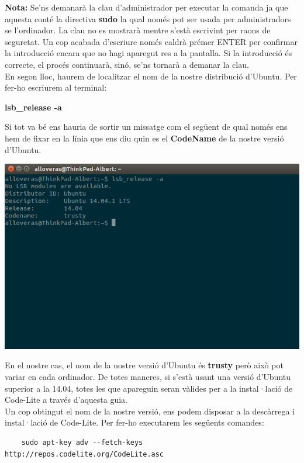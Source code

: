 \documentclass[11pt]{article}
\begin{document}
\noindent \textbf{Nota:} Se'ns demanarà la clau d'administrador per executar la comanda ja que aquesta conté la directiva \textbf{sudo} la qual només pot ser usada per administradors se l'ordinador. La clau no es mostrarà mentre s'està escrivint per raons de seguretat. Un cop acabada d'escriure només caldrà prémer ENTER per confirmar la introducció encara que no hagi aparegut res a la pantalla. Si la introducció és correcte, el procés continuarà, sinó, se'ns tornarà a demanar la clau. \\

\noindent En segon lloc, haurem de localitzar el nom de la nostre distribució d'Ubuntu. Per fer-ho escriurem al terminal:
\begin{center}
	\textbf{lsb\_release -a}
\end{center}

\pagebreak
\noindent Si tot va bé ens hauria de sortir un missatge com el següent de qual només ens hem de fixar en la línia que ens diu quin es el \textbf{CodeName} de la nostre versió d'Ubuntu.
\begin{center}
	\includegraphics[scale=0.3]{img/Ubuntu_Code_Name.png}
\end{center}
\noindent En el nostre cas, el nom de la nostre versió d'Ubuntu és \textbf{trusty} però això pot variar en cada ordinador. De totes maneres, si s'està usant una versió d'Ubuntu superior a la 14.04, totes les que apareguin seran vàlides per a la instal·lació de Code-Lite a través d'aquesta guia. \\

\noindent Un cop obtingut el nom de la nostre versió, ens podem disposar a la descàrrega i instal·lació de Code-Lite. Per fer-ho executarem les següents comandes:
\small \begin{center}
	\begin{verbatim}
	sudo apt-key adv --fetch-keys http://repos.codelite.org/CodeLite.asc
	\end{verbatim}
\end{center}
\end{document}
